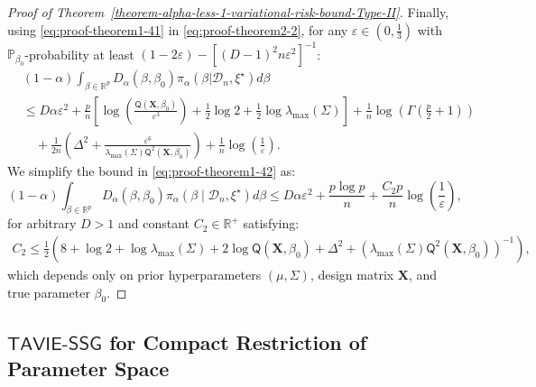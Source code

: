 \documentclass[12pt]{article}
\numberwithin{equation}{section}
\newcommand{\tssg}{\mathsf{TAVIE}\text{-}\mathsf{SSG}}
\begin{document}
\begin{proof}[Proof of Theorem~\ref{theorem-alpha-less-1-variational-risk-bound-Type-II}]
Finally, using \eqref{eq:proof-theorem1-41} in \eqref{eq:proof-theorem2-2}, for any $\varepsilon \in \left(0,\frac{1}{3}\right)$ with $\mathbb{P}_{\beta_0}$-probability at least $(1 - 2\varepsilon) - [(D-1)^2n\varepsilon^2]^{-1}$:
%
\begin{equation}\label{eq:proof-theorem1-42}
\begin{split}
    &(1-\alpha)\int_{\beta\in \mathbb{R}^p} D_{\alpha}(\beta, \beta_0)\pi_{\alpha}(\beta| \mathcal{D}_n, \xi^{\star})d\beta\\
&\leq D\alpha\varepsilon^2 + \frac{p}{n}\left[\log \left(\frac{\mathsf{Q}( \mathbf{X}, \beta_0)}{\varepsilon^3}\right) + \frac{1}{2} \log 2 + \frac{1}{2}\log \lambda_{\max}(\Sigma)\right] + \frac{1}{n}\log \left(\Gamma\left(\frac{p}{2} + 1\right)\right)\\
&\quad + \frac{1}{2n}\left(\Delta^2 + \frac{\varepsilon^6}{\lambda_{\mathrm{max}}(\Sigma)\mathsf{Q}^{2}(\mathbf{X}, \beta_0)}\right) + \frac{1}{n}\log\left(\frac{1}{\varepsilon}\right).
\end{split}
\end{equation}
%
We simplify the bound in \eqref{eq:proof-theorem1-42} as:
%
\begin{equation}\label{eq:proof-theorem1-final-TypeII-bound}
\boxed{(1-\alpha)\int_{\beta\in \mathbb{R}^p} D_{\alpha}(\beta, \beta_0)\pi_{\alpha}(\beta\mid \mathcal{D}_n, \xi^{\star})d\beta \leq D\alpha\varepsilon^2 + \frac{p \log p}{n} + \frac{C_2 p}{n}\log\left(\frac{1}{\varepsilon}\right)},
\end{equation}
%
for arbitrary $D>1$ and constant $C_2\in \mathbb{R}^{+}$ satisfying:
\begin{align}\label{eq:proof-theorem1-bound-constants-type-II}
C_2 \leq \frac{1}{2}\left(8 + \log 2 + \log \lambda_{\max}(\Sigma) + 2\log \mathsf{Q}( \mathbf{X}, \beta_0) + \Delta^2 + \left(\lambda_{\max}(\Sigma)\mathsf{Q}^2(\mathbf{X}, \beta_0)\right)^{-1}\right),
\end{align}
which depends only on prior hyperparameters $(\mu, \Sigma)$, design matrix $\mathbf{X}$, and true parameter $\beta_0$. 
\end{proof}

\subsection{\texorpdfstring{$\tssg$}{TAVIE-SSG} for Compact Restriction of Parameter Space}\label{subsec:compact-parameter-space}
\end{document}

